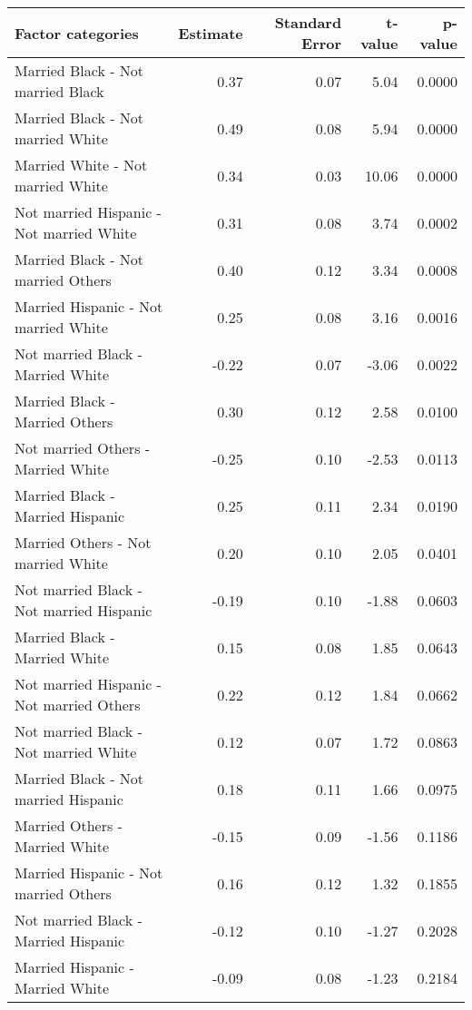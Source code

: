 \documentclass[11pt]{extarticle} %
\begin{document}
\begin{table}[H]
\footnotesize
\centering
\begin{tabular}{lrrrr}
  \hline
  Factor categories & Estimate & Standard Error & t-value & p-value \\ 
  \hline
    Married Black -  Not married Black & 0.37 & 0.07 & 5.04 & 0.0000 \\ 
    Married Black -  Not married White & 0.49 & 0.08 & 5.94 & 0.0000 \\ 
    Married White -  Not married White & 0.34 & 0.03 & 10.06 & 0.0000 \\ 
    Not married Hispanic -  Not married White & 0.31 & 0.08 & 3.74 & 0.0002 \\ 
    Married Black -  Not married Others & 0.40 & 0.12 & 3.34 & 0.0008 \\ 
    Married Hispanic -  Not married White & 0.25 & 0.08 & 3.16 & 0.0016 \\ 
    Not married Black -  Married White & -0.22 & 0.07 & -3.06 & 0.0022 \\ 
    Married Black -  Married Others & 0.30 & 0.12 & 2.58 & 0.0100 \\ 
    Not married Others -  Married White & -0.25 & 0.10 & -2.53 & 0.0113 \\ 
    Married Black -  Married Hispanic & 0.25 & 0.11 & 2.34 & 0.0190 \\ 
    Married Others -  Not married White & 0.20 & 0.10 & 2.05 & 0.0401 \\ 
    Not married Black -  Not married Hispanic & -0.19 & 0.10 & -1.88 & 0.0603 \\ 
    Married Black -  Married White & 0.15 & 0.08 & 1.85 & 0.0643 \\ 
    Not married Hispanic -  Not married Others & 0.22 & 0.12 & 1.84 & 0.0662 \\ 
    Not married Black -  Not married White & 0.12 & 0.07 & 1.72 & 0.0863 \\ 
    Married Black -  Not married Hispanic & 0.18 & 0.11 & 1.66 & 0.0975 \\ 
    Married Others -  Married White & -0.15 & 0.09 & -1.56 & 0.1186 \\ 
    Married Hispanic -  Not married Others & 0.16 & 0.12 & 1.32 & 0.1855 \\ 
    Not married Black -  Married Hispanic & -0.12 & 0.10 & -1.27 & 0.2028 \\ 
    Married Hispanic -  Married White & -0.09 & 0.08 & -1.23 & 0.2184 \\ 

\end{tabular}
\end{table}
\end{document}

